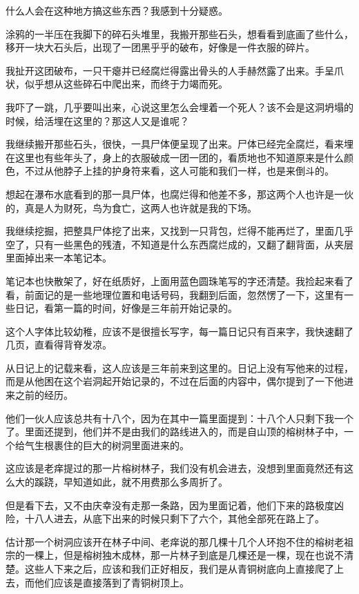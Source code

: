 什么人会在这种地方搞这些东西？我感到十分疑惑。

涂鸦的一半压在我脚下的碎石头堆里，我搬开那些石头，想看看到底画了些什么，移开一块大石头后，出现了一团黑乎乎的破布，好像是一件衣服的碎片。

我扯开这团破布，一只干瘪并已经腐烂得露出骨头的人手赫然露了出来。手呈爪状，似乎想从这些碎石中爬出来，而终于力竭而死。

我吓了一跳，几乎要叫出来，心说这里怎么会埋着一个死人？该不会是这洞坍塌的时候，给活埋在这里的？那这人又是谁呢？

我继续搬开那些石头，很快，一具尸体便呈现了出来。尸体已经完全腐烂，看来埋在这里也有些年头了，身上的衣服破成一团一团的，看质地也不知道原来是什么颜色，不过从他脖子上挂的护身符来看，这人可能和我们一样，也是来倒斗的。

想起在瀑布水底看到的那一具尸体，也腐烂得和他差不多，那这两个人也许是一伙的，真是人为财死，鸟为食亡，这两人也许就是我的下场。

我继续挖掘，把整具尸体挖了出来，又找到一只背包，烂得不能再烂了，里面几乎空了，只有一些黑色的残渣，不知道是什么东西腐烂成的，又翻了翻背面，从夹层里面掉出来一本笔记本。

笔记本也快散架了，好在纸质好，上面用蓝色圆珠笔写的字还清楚。我捡起来看了看，前面记的是一些地理位置和电话号码，我翻到后面，忽然愣了一下，这里有一些日记，看第一篇的时间，好像是三年前开始记录的。

这个人字体比较幼稚，应该不是很擅长写字，每一篇日记只有百来字，我快速翻了几页，直看得背脊发凉。

从日记上的记载来看，这人应该是三年前来到这里的。日记上没有写他来的过程，而是从他困在这个岩洞起开始记录的，不过在后面的内容中，偶尔提到了一下他进来之前的经历。

他们一伙人应该总共有十八个，因为在其中一篇里面提到：十八个人只剩下我一个了。里面还提到，他们并不是由我们的路线进入的，而是自山顶的榕树林子中，一个给气生根裹住的巨大的树洞里面进来的。

这应该是老痒提过的那一片榕树林子，我们没有机会进去，没想到里面竟然还有这么大的蹊跷，早知道如此，就不用费那么多周折了。

但是看下去，又不由庆幸没有走那一条路，因为里面记着，他们下来的路极度凶险，十八人进去，从底下出来的时候只剩下了六个，其他全部死在路上了。

估计那一个树洞应该开在林子中间、老痒说的那几棵十几个人环抱不住的榕树老祖宗的一棵上，但是榕树独木成林，那一片林子到底是几棵还是一棵，现在也说不清楚。这些人下来之后，应该和我们正好相反，我们是从青铜树底向上直接爬了上去，而他们应该是直接落到了青铜树顶上。

